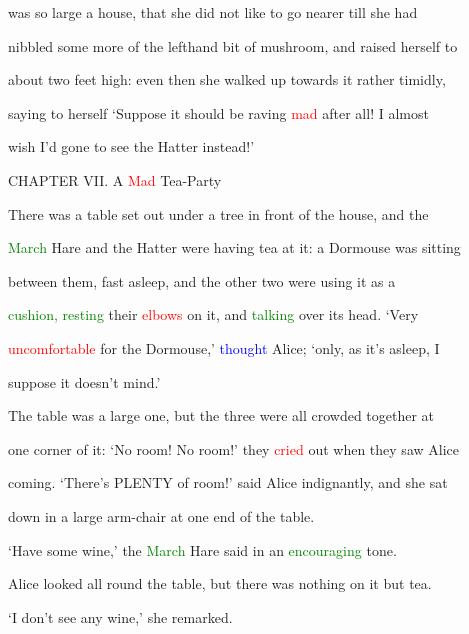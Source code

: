  was so large a house, that she did not like to go nearer till she had

 nibbled some more of the lefthand bit of mushroom, and raised herself to

 about two feet high: even then she walked up towards it rather timidly,

 saying to herself ‘Suppose it should be \textcolor{BurntOrange}{raving} \textcolor{red}{mad} after all! I almost

 wish I’d gone to see the Hatter instead!’









 CHAPTER VII. A \textcolor{red}{Mad} Tea-Party



 There was a table set out under a \textcolor{BurntOrange}{tree} in front of the house, and the

 \textcolor{green}{March} Hare and the Hatter were having tea at it: a Dormouse was sitting

 between them, fast asleep, and the other two were using it as a

 \textcolor{green}{cushion,} \textcolor{green}{resting} their \textcolor{red}{elbows} on it, and \textcolor{green}{talking} over its head. ‘Very

 \textcolor{red}{uncomfortable} for the Dormouse,’ \textcolor{blue}{thought} Alice; ‘only, as it’s asleep, I

 suppose it doesn’t mind.’



 The table was a large one, but the three were all crowded together at

 one corner of it: ‘No room! No room!’ they \textcolor{red}{cried} out when they saw Alice

 coming. ‘There’s PLENTY of room!’ said Alice indignantly, and she sat

 down in a large arm-chair at one end of the table.



 ‘Have some wine,’ the \textcolor{green}{March} Hare said in an \textcolor{green}{encouraging} tone.



 Alice looked all round the table, but there was nothing on it but tea.

 ‘I don’t see any wine,’ she remarked.



